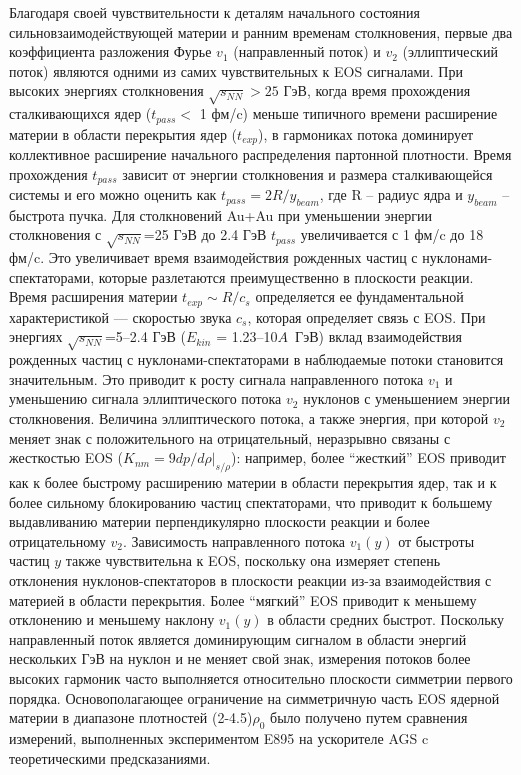 Благодаря своей чувствительности к деталям начального состояния сильновзаимодействующей материи и ранним временам столкновения, первые два коэффициента разложения Фурье $v_1$ (направленный поток) и $v_2$ (эллиптический поток) являются одними из самих чувствительных к EOS сигналами.
При высоких энергиях столкновения $\sqrt{s_{NN}} > 25$ ГэВ, когда время прохождения сталкивающихся ядер ($t_{pass}<$ 1 фм/c)  меньше типичного времени расширение  материи в области перекрытия ядер ($t_{exp}$), в гармониках потока доминирует коллективное расширение начального распределения партонной плотности. 
Время прохождения $t_{pass}$ зависит от энергии столкновения и размера сталкивающейся системы и его можно оценить как $t_{pass}=2R/y_{beam}$, где R -- радиус ядра и $y_{beam}$ -- быстрота пучка. 
Для столкновений Au+Au при уменьшении энергии столкновения с  $\sqrt{s_{NN}}$=25 ГэВ до 2.4 ГэВ $t_{pass}$ увеличивается с 1 фм/c до 18 фм/c. 
Это увеличивает время взаимодействия рожденных частиц с нуклонами-спектаторами, которые разлетаются преимущественно в плоскости реакции. 
Время расширения материи $t_{exp} \sim R/c_{s}$  определяется ее фундаментальной характеристикой — скоростью звука $c_s$, которая определяет связь  с EOS. 
При энергиях $\sqrt{s_{NN}}$=5--2.4 ГэВ ($E_{kin}$ = 1.23--10$A$~ГэВ) вклад взаимодействия рожденных частиц с нуклонами-спектаторами в наблюдаемые потоки становится значительным. 
Это приводит к росту сигнала направленного потока $v_1$ и уменьшению сигнала эллиптического потока $v_2$ нуклонов с уменьшением энергии столкновения. 
Величина эллиптического потока, а также энергия, при которой $v_2$ меняет знак с положительного на отрицательный, неразрывно связаны с жесткостью EOS ($K_{nm}=9dp/d\rho|_{s/\rho}$): например, более ``жесткий'' EOS приводит как к более быстрому расширению материи в области перекрытия ядер, так и к более сильному блокированию частиц спектаторами, что приводит к большему выдавливанию материи перпендикулярно плоскости реакции  и более отрицательному $v_2$. 
Зависимость направленного потока $v_1(y)$ от быстроты частиц $y$ также чувствительна к EOS, поскольку она измеряет степень отклонения нуклонов-спектаторов в плоскости реакции из-за взаимодействия с материей в области перекрытия. 
Более ``мягкий'' EOS приводит к меньшему отклонению и меньшему наклону  $v_1(y)$ в области средних быстрот. 
Поскольку направленный поток является доминирующим сигналом в области энергий нескольких ГэВ на нуклон и не меняет свой знак, измерения потоков более высоких гармоник часто выполняется относительно плоскости симметрии первого порядка.
Основополагающее ограничение на симметричную часть EOS ядерной материи  в диапазоне плотностей (2-4.5)$\rho_{0}$ было получено путем сравнения измерений, выполненных экспериментом E895 на ускорителе AGS c теоретическими предсказаниями. 
